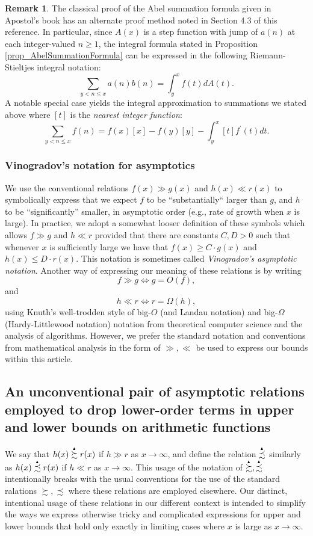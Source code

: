 \documentclass[11pt,reqno,a4letter]{article}
\numberwithin{figure}{section}
\numberwithin{table}{section}
\theoremstyle{plain}
\numberwithin{theorem}{section}
\theoremstyle{definition}
\newtheorem{remark}[theorem]{Remark}
\newcommand{\SuccSim}[0]{\overset{_{\scriptsize{\blacktriangle}}}{\succsim}}
\newcommand{\PrecSim}[0]{\overset{_{\scriptsize{\blacktriangle}}}{\precsim}}
\begin{document}
\begin{remark}
The classical proof of the Abel summation formula given in Apostol's book has an alternate proof method 
noted in Section 4.3 of this reference. In particular, since $A(x)$ is a step function with jump of $a(n)$ 
at each integer-valued $n \geq 1$, the integral formula stated in 
Proposition \ref{prop_AbelSummationFormula} can be expressed in the following Riemann-Stieltjes integral 
notation: 
\[
\sum_{y < n \leq x} a(n) b(n) = \int_y^x f(t) dA(t). 
\]
A notable special case yields the integral approximation to summations we stated above where $[t]$ is the 
\emph{nearest integer function}: 
\[
\sum_{y < n \leq x} f(n) = f(x) [x] - f(y) [y] - \int_{y}^x [t] f^{\prime}(t) dt. 
\]
\end{remark}

\subsubsection{Vinogradov's notation for asymptotics} 

We use the conventional relations $f(x) \gg g(x)$ and $h(x) \ll r(x)$ to symbolically express that we expect 
$f$ to be ``substantially`` larger than $g$, and $h$ to be ``significantly'' smaller, in asymptotic order 
(e.g., rate of growth when $x$ is large). In practice, we adopt a somewhat looser definition of these symbols which 
allows $f \gg g$ and $h \ll r$ provided that there are constants $C, D > 0$ such that whenever $x$ is sufficiently 
large we have that $f(x) \geq C \cdot g(x)$ and $h(x) \leq D \cdot r(x)$. This notation is sometimes called 
\emph{Vinogradov's asymptotic notation}. Another way of expressing our meaning of these relations is by writing 
$$f \gg g \iff g = O(f),$$ and $$h \ll r \iff r = \Omega(h),$$ using Knuth's well-trodden 
style of big-$O$ (and Landau notation) and big-$\Omega$ (Hardy-Littlewood notation)
notation from theoretical computer science and the analysis of algorithms. However, we prefer the standard notation and 
conventions from mathematical analysis in the form of $\gg,\ll$ be used to express our bounds within this article. 

\subsection{An unconventional pair of asymptotic relations employed to drop 
            lower-order terms in upper and lower bounds on arithmetic functions} 
               
We say that $h(x) \SuccSim r(x)$ if $h \gg r$ as $x \rightarrow \infty$, and define 
the relation $\PrecSim$ similarly as 
$h(x) \PrecSim r(x)$ if $h \ll r$ as $x \rightarrow \infty$. 
This usage of the notation of $\SuccSim,\PrecSim$ intentionally breaks with the usual conventions for the use of 
the standard ralations $\succsim,\precsim$ where these relations 
are employed elsewhere. Our distinct, intentional usage of these relations in our different context is intended to 
simplify the ways we express otherwise tricky and complicated expressions for upper and lower bounds that hold only 
exactly in limiting cases where $x$ is large as $x \rightarrow \infty$. 
\end{document}
